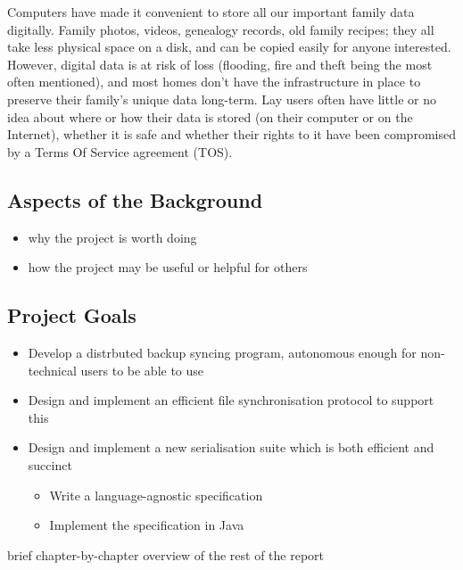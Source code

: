 \documentclass[12pt,a4paper,]{book}
\begin{document}
Computers have made it convenient to store all our important family data
digitally. Family photos, videos, genealogy records, old family recipes;
they all take less physical space on a disk, and can be copied easily
for anyone interested. However, digital data is at risk of loss
(flooding, fire and theft being the most often mentioned), and most
homes don't have the infrastructure in place to preserve their family's
unique data long-term. Lay users often have little or no idea about
where or how their data is stored (on their computer or on the
Internet), whether it is safe and whether their rights to it have been
compromised by a Terms Of Service agreement (TOS).

\subsection{Aspects of the Background}\label{aspects-of-the-background}

\begin{itemize}
\itemsep1pt\parskip0pt
\item
  why the project is worth doing
\item
  how the project may be useful or helpful for others
\end{itemize}

\subsection{Project Goals}\label{project-goals}

\begin{itemize}
\itemsep1pt\parskip0pt
\item
  Develop a distrbuted backup syncing program, autonomous enough for
  non-technical users to be able to use
\item
  Design and implement an efficient file synchronisation protocol to
  support this
\item
  Design and implement a new serialisation suite which is both efficient
  and succinct

  \begin{itemize}
  \itemsep1pt\parskip0pt
  \item
    Write a language-agnostic specification
  \item
    Implement the specification in Java
  \end{itemize}
\end{itemize}

brief chapter-by-chapter overview of the rest of the report
\end{document}
